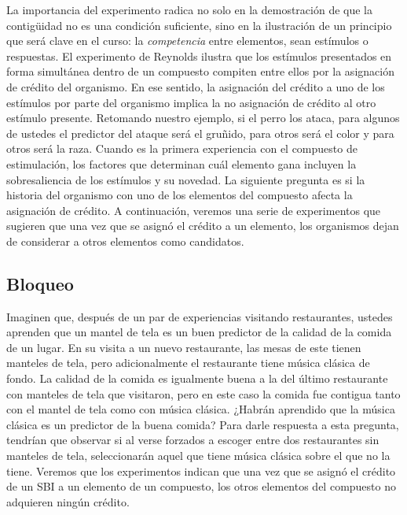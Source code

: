 \documentclass[
  letterpaper,
]{book}
\begin{document}
La importancia del experimento radica no solo en la demostración de que
la contigüidad no es una condición suficiente, sino en la ilustración de
un principio que será clave en el curso: la \emph{competencia} entre
elementos, sean estímulos o respuestas. El experimento de Reynolds
ilustra que los estímulos presentados en forma simultánea dentro de un
compuesto compiten entre ellos por la asignación de crédito del
organismo. En ese sentido, la asignación del crédito a uno de los
estímulos por parte del organismo implica la no asignación de crédito al
otro estímulo presente. Retomando nuestro ejemplo, si el perro los
ataca, para algunos de ustedes el predictor del ataque será el gruñido,
para otros será el color y para otros será la raza. Cuando es la primera
experiencia con el compuesto de estimulación, los factores que
determinan cuál elemento gana incluyen la sobresaliencia de los
estímulos y su novedad. La siguiente pregunta es si la historia del
organismo con uno de los elementos del compuesto afecta la asignación de
crédito. A continuación, veremos una serie de experimentos que sugieren
que una vez que se asignó el crédito a un elemento, los organismos dejan
de considerar a otros elementos como candidatos.

\subsection{Bloqueo}\label{bloqueo}

Imaginen que, después de un par de experiencias visitando restaurantes,
ustedes aprenden que un mantel de tela es un buen predictor de la
calidad de la comida de un lugar. En su visita a un nuevo restaurante,
las mesas de este tienen manteles de tela, pero adicionalmente el
restaurante tiene música clásica de fondo. La calidad de la comida es
igualmente buena a la del último restaurante con manteles de tela que
visitaron, pero en este caso la comida fue contigua tanto con el mantel
de tela como con música clásica. ¿Habrán aprendido que la música clásica
es un predictor de la buena comida? Para darle respuesta a esta
pregunta, tendrían que observar si al verse forzados a escoger entre dos
restaurantes sin manteles de tela, seleccionarán aquel que tiene música
clásica sobre el que no la tiene. Veremos que los experimentos indican
que una vez que se asignó el crédito de un SBI a un elemento de un
compuesto, los otros elementos del compuesto no adquieren ningún
crédito.
\end{document}
